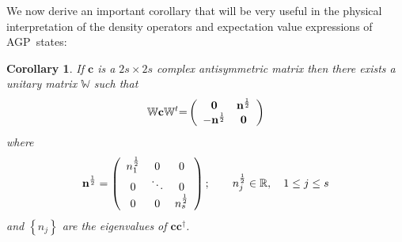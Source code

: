 \documentclass[aps,preprint]{revtex4}%
\newtheorem{corollary}{Corollary}
\begin{document}
We now derive an important corollary that will be very useful in the physical
interpretation of the density operators and expectation value expressions of AGP\ states:

\begin{corollary}
If $\mathbf{c}$ is a $2s\times2s$ complex antisymmetric matrix then there
exists a unitary matrix $\mathbb{W}$ such that
\begin{equation}
\mathbb{W}\mathbf{c}\mathbb{W}^{t}\mathbb{=}\left(
\begin{array}
[c]{cc}%
\mathbf{0} & \mathbf{n}^{\frac{1}{2}}\\
-\mathbf{n}^{\frac{1}{2}} & \mathbf{0}%
\end{array}
\right)
\end{equation}
where
\begin{equation}
\mathbf{n}^{\frac{1}{2}}=\left(
\begin{array}
[c]{ccc}%
n_{1}^{\frac{1}{2}} & 0 & 0\\
0 & \ddots & 0\\
0 & 0 & n_{s}^{\frac{1}{2}}%
\end{array}
\right)  ;\qquad n_{j}^{\frac{1}{2}}\in\mathbb{R},\quad1\leq j\leq s
\end{equation}
and $\left\{  n_{j}\right\}  $ are the eigenvalues of $\mathbf{cc}^{\dagger}$.
\end{corollary}
\end{document}
